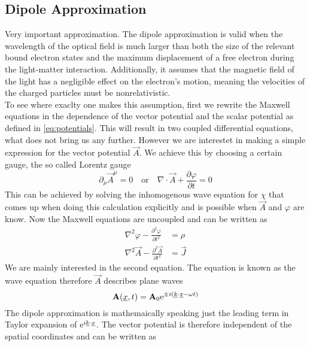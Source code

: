 \subsection{Dipole Approximation}
Very important approximation. 
The dipole approximation is valid when the wavelength of the optical field is much larger than both the size of the relevant bound electron states and the maximum displacement of a free electron during the light-matter interaction. 
Additionally, it assumes that the magnetic field of the light has a negligible effect on the electron's motion, meaning the velocities of the charged particles must be nonrelativistic. \\
To see where exaclty one makes this assumption, first we rewrite the Maxwell equations in the dependence of the vector potential and the scalar potential as defined in \eqref{eq:potentials}. 
This will result in two coupled differential equations, what does not bring us any further. 
However we are interestet in making a simple expression for the vector potential $\vec{A}$.
We achieve this by choosing a certain gauge, the so called Lorentz gauge
\begin{equation*}
    \partial_{\mu} \vec{A}^{\mu} = 0 \quad \text{or} \quad \nabla \cdot \vec{A} + \frac{\partial \varphi}{\partial t} = 0
\end{equation*}
This can be achieved by solving the inhomogenous wave equation for $\chi$ that comes up when doing this calculation explicitly and is possible when $\vec{A}$ and $\varphi$ are know.
Now the Maxwell equations are uncoupled and can be written as
\begin{equation*}
    \begin{aligned}
        \nabla^2 \varphi - \frac{\partial^2 \varphi}{\partial t^2} &= \rho \\
        \nabla^2 \vec{A} - \frac{\partial^2 \vec{A}}{\partial t^2} &= \vec{J} 
    \end{aligned}
\end{equation*}
We are mainly interested in the second equation. The equation is known as the wave equation therefore $\vec{A}$ describes plane waves
\begin{equation*}
    \mathbf{A}(\underline{x}, t) = \mathbf{A}_0 \mathrm{e}^{\pm i (\underline{k} \cdot \underline{x} - \omega t)}
\end{equation*}
The dipole approximation is mathemaically speaking just the leading term in Taylor expansion of $\mathrm{e}^{i\underline{k} \cdot \underline{x}}$. 
The vector potential is therefore independent of the spatial coordinates and can be written as

